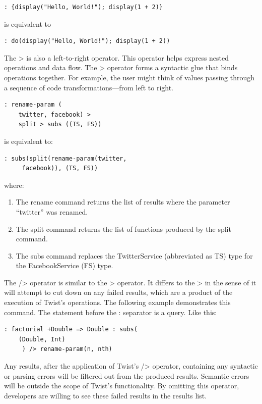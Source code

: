 \begin{verbatim}
: {display("Hello, World!"); display(1 + 2)}
\end{verbatim}

is equivalent to

\begin{verbatim}
: do(display("Hello, World!"); display(1 + 2))
\end{verbatim}

The > is also a left-to-right operator. This operator helps express nested operations and data flow.  The > operator forms a syntactic glue that binds operations together. For example, the user might think of values passing through a sequence of code transformations---from left to right.

\begin{verbatim}
: rename-param (
	twitter, facebook) > 
	split > subs ((TS, FS))
\end{verbatim}

is equivalent to:

\begin{verbatim}
: subs(split(rename-param(twitter, 
	 facebook)), (TS, FS))
\end{verbatim}

where:

\begin{enumerate}
	\item The rename command returns the list of results where the parameter ``twitter'' was 
	renamed.
	\item The split command returns the list of functions produced by the split command.
	\item The subs command replaces the TwitterService (abbreviated as TS) type for the 
	FacebookService (FS) type.
\end{enumerate}

The /> operator is similar to the > operator. It differs to the > in the sense of it will attempt to cut down on any failed results, which are a product of the execution of Twist's operations. The following example demonstrates this command. The statement before the : separator is a query. Like this:

\begin{verbatim}
: factorial +Double => Double : subs(
	(Double, Int)
	 ) /> rename-param(n, nth) 
\end{verbatim}

Any results, after the application of Twist's /> operator, containing any syntactic or parsing errors will be filtered out from the produced results. Semantic errors will be outside the scope of Twist's functionality. By omitting this operator, developers are willing to see these failed results in the results list.

